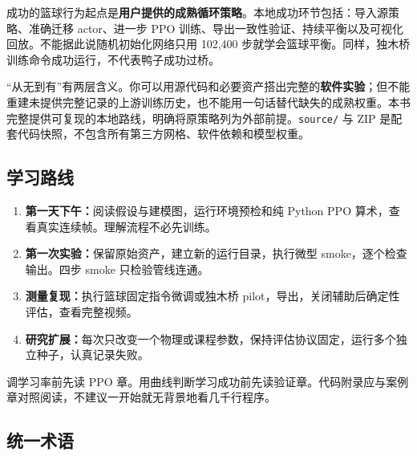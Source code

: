 \documentclass[
  chinese,
  11pt,
  letterpaper,
]{article}
\providecommand{\tightlist}{%
  \setlength{\itemsep}{0pt}\setlength{\parskip}{0pt}}
\begin{document}
成功的篮球行为起点是\textbf{用户提供的成熟循环策略}。本地成功环节包括：导入源策略、准确迁移
actor、进一步 PPO
训练、导出一致性验证、持续平衡以及可视化回放。不能据此说随机初始化网络只用
102,400
步就学会篮球平衡。同样，独木桥训练命令成功运行，不代表鸭子成功过桥。

``从无到有''有两层含义。你可以用源代码和必要资产搭出完整的\textbf{软件实验}；但不能重建未提供完整记录的上游训练历史，也不能用一句话替代缺失的成熟权重。本书完整提供可复现的本地路线，明确将原策略列为外部前提。\texttt{source/}
与 ZIP 是配套代码快照，不包含所有第三方网格、软件依赖和模型权重。

\subsection{学习路线}\label{ux5b66ux4e60ux8defux7ebf}

\begin{enumerate}
\def\labelenumi{\arabic{enumi}.}
\tightlist
\item
  \textbf{第一天下午：}阅读假设与建模图，运行环境预检和纯 Python PPO
  算术，查看真实连续帧。理解流程不必先训练。
\item
  \textbf{第一次实验：}保留原始资产，建立新的运行目录，执行微型
  smoke，逐个检查输出。四步 smoke 只检验管线连通。
\item
  \textbf{测量复现：}执行篮球固定指令微调或独木桥
  pilot，导出，关闭辅助后确定性评估，查看完整视频。
\item
  \textbf{研究扩展：}每次只改变一个物理或课程参数，保持评估协议固定，运行多个独立种子，认真记录失败。
\end{enumerate}

调学习率前先读 PPO
章。用曲线判断学习成功前先读验证章。代码附录应与案例章对照阅读，不建议一开始就无背景地看几千行程序。

\subsection{统一术语}\label{ux7edfux4e00ux672fux8bed}
\end{document}
